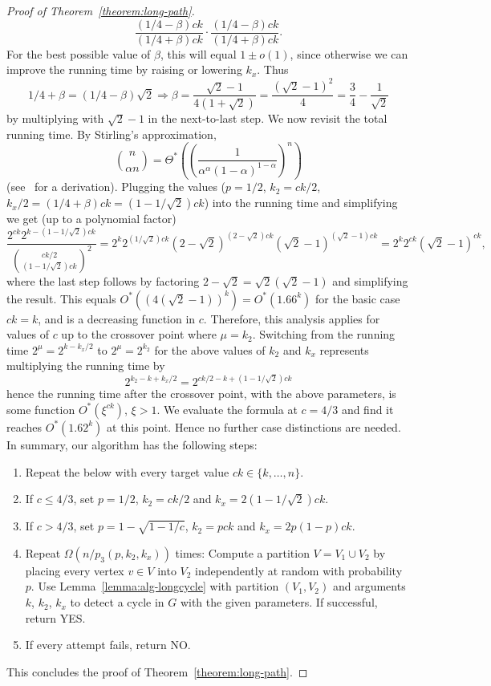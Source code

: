\documentclass{theoretics}
\begin{document}
\begin{proof}[Proof of Theorem~\ref{theorem:long-path}]
\[{      \frac{(1/4-\beta)ck}{(1/4+\beta)ck} \cdot
      \frac{(1/4-\beta)ck}{(1/4+\beta)ck}}.
  \]
  For the best possible value of $\beta$, this will equal $1 \pm o(1)$,  
  since otherwise we can improve the running time by raising or
  lowering $k_x$. Thus
  \[
    1/4 + \beta = (1/4-\beta)\sqrt{2} \Rightarrow
    \beta = \frac{\sqrt{2}-1}{4(1+\sqrt{2})}  =   \frac{(\sqrt{2}-1)^2}{4} 
    = \frac{3}{4} - \frac{1}{\sqrt{2}}
  \]
  by multiplying with $\sqrt{2}-1$ in the next-to-last step.
  We now revisit the total running time. By Stirling's approximation,
  \[
    \binom{n}{\alpha n} 
    = \Theta^*\left(\left( \frac{1}{\alpha^{\alpha} (1-\alpha)^{1-\alpha}} \right)^n\right)
  \]
  (see~\cite{BjorklundHKK17narrow} for a derivation).
  Plugging the values ($p=1/2$, $k_2=ck/2$, $k_x/2=(1/4+\beta)ck=(1-1/\sqrt{2})ck$)
  into the running time and simplifying we get (up to a polynomial factor)
  \[
    \frac{2^{ck} 2^{k-(1-1/\sqrt{2})ck}}
    {\binom{ck/2}{(1-1/\sqrt{2})ck}^2}
    =
    2^k2^{(1/\sqrt{2})ck}(2-\sqrt{2})^{(2-\sqrt{2})ck} (\sqrt{2}-1)^{(\sqrt{2}-1)ck}
    =  2^k2^{ck} (\sqrt{2}-1)^{ck},
  \]
  where the last step follows by factoring $2-\sqrt{2} = \sqrt{2}(\sqrt{2}-1)$ and
  simplifying the result.
  This equals $O^*((4(\sqrt{2}-1))^k)=O^*(1.66^k)$ for the basic case $ck=k$,
  and is a decreasing function in $c$. Therefore, this analysis
  applies for values of $c$ up to the crossover point where $\mu=k_2$. 
  Switching from the running time $2^\mu=2^{k-k_x/2}$ to $2^\mu=2^{k_2}$
  for the above values of $k_2$ and $k_x$ 
  represents multiplying the running time by
  \[
    2^{k_2-k+k_x/2}=2^{ck/2-k+(1-1/\sqrt{2})ck}
  \]
  hence the running time after the crossover point, with the above
  parameters, is some function $O^*(\xi^{ck})$, $\xi>1$. We evaluate
  the formula at $c=4/3$ and find it reaches $O^*(1.62^k)$ at this point. 
  Hence no further case distinctions are needed. In summary, our
  algorithm has the following steps:
  \begin{enumerate}
  \item Repeat the below with every target value $ck \in \{k,\ldots,n\}$.
  \item If $c \leq 4/3$, set $p=1/2$, $k_2=ck/2$ and $k_x=2(1-1/\sqrt{2})ck$.
  \item If $c>4/3$, set $p = 1-\sqrt{1-1/c}$, $k_2=pck$ and $k_x=2p(1-p)ck$.
  \item Repeat $\Omega(n/p_3(p, k_2, k_x))$ times: Compute a partition $V=V_1 \cup V_2$ 
    by placing every vertex $v \in V$ into $V_2$ independently at
    random with probability $p$. Use Lemma~\ref{lemma:alg-longcycle}
    with partition $(V_1,V_2)$ and arguments $k$, $k_2$, $k_x$
    to detect a cycle in $G$ with the given parameters. If successful,
    return YES.
  \item If every attempt fails, return NO.
  \end{enumerate}  
  This concludes the proof of Theorem~\ref{theorem:long-path}.
\end{proof}
\end{document}
